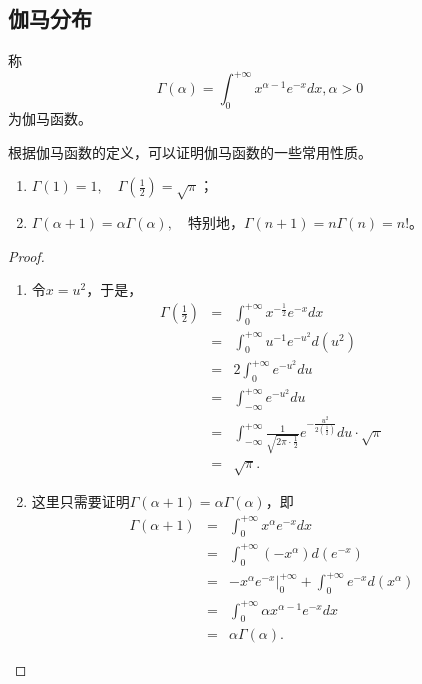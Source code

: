 \subsection{伽马分布}
\begin{definition}
    称
    $$\Gamma (\alpha )=\int_{0}^{+\infty } x^{\alpha -1} e^{-x} dx,\alpha >0$$
    为伽马函数。
\end{definition}
根据伽马函数的定义，可以证明伽马函数的一些常用性质。
\begin{property}
    \begin{enumerate}
        \item $\Gamma (1 )=1, \quad \Gamma (\frac{1}{2}  )=\sqrt{\pi } $；
        \item $\Gamma (\alpha +1 )=\alpha \Gamma(\alpha ), \quad \text{特别地，}\Gamma (n+1 )=n\Gamma(n)=n!$。
    \end{enumerate}
    \end{property}
    \begin{proof}
    \begin{enumerate}
        \item 令$x=u^{2}$，于是，
        \begin{eqnarray*}
            \Gamma \left(\frac{1}{2} \right)&=&\int_{0}^{+\infty } x^{-\frac{1}{2} } e^{-x} dx\\
            &=&\int_{0}^{+\infty } u^{-1} e^{-u^{2}}d(u^{2} ) \\
            &=& 2\int_{0}^{+\infty }e^{-u^{2}}du\\
            &=& \int_{-\infty }^{+\infty} e^{-u^{2}}du\\
            &=& \int_{-\infty }^{+\infty}\frac{1}{\sqrt{2\pi \cdot \frac{1}{2} } } e^{-\frac{u^{2} }{2(\frac{1}{2} )} }du\cdot \sqrt{\pi }\\
            &=& \sqrt{\pi }.
       \end{eqnarray*}
        \item 这里只需要证明$\Gamma (\alpha +1 )=\alpha \Gamma(\alpha )$，即
        \begin{eqnarray*}
            \Gamma (\alpha +1)
           &=&\int_{0}^{+\infty} x^{\alpha } e^{-x} dx\\
           &=&\int_{0}^{+\infty} \left ( -x^{\alpha }  \right ) d\left ( e^{-x}  \right ) \\
           &=&-x^{\alpha }e^{-x}|_{0}^{+\infty } +\int_{0}^{+\infty} e^{-x} d\left ( x^{\alpha } \right ) \\
           &=&\int_{0}^{+\infty} \alpha x^{\alpha-1 }e^{-x} dx\\
           &=&\alpha \Gamma(\alpha ).
        \end{eqnarray*}
    \end{enumerate}   
    \end{proof}
    
